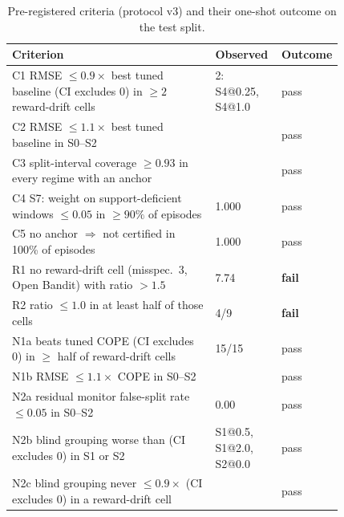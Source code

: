 \begin{table}[t]\centering\scriptsize
\caption{Pre-registered criteria (protocol v3) and their one-shot outcome on the test split.}
\label{tab:criteria}
\begin{tabular}{@{}p{0.62\linewidth}p{0.2\linewidth}l@{}}\toprule Criterion & Observed & Outcome \\\midrule
C1 RMSE $\le 0.9\times$ best tuned baseline (CI excludes 0) in $\ge 2$ reward-drift cells & 2: S4@0.25, S4@1.0 & pass \\
C2 RMSE $\le 1.1\times$ best tuned baseline in S0--S2 &  & pass \\
C3 split-interval coverage $\ge 0.93$ in every regime with an anchor &  & pass \\
C4 S7: weight on support-deficient windows $\le 0.05$ in $\ge 90\%$ of episodes & 1.000 & pass \\
C5 no anchor $\Rightarrow$ not certified in 100\% of episodes & 1.000 & pass \\
R1 no reward-drift cell (misspec.\ 3, Open Bandit) with ratio $> 1.5$ & 7.74 & \textbf{fail} \\
R2 ratio $\le 1.0$ in at least half of those cells & 4/9 & \textbf{fail} \\
N1a beats tuned COPE (CI excludes 0) in $\ge$ half of reward-drift cells & 15/15 & pass \\
N1b RMSE $\le 1.1\times$ COPE in S0--S2 &  & pass \\
N2a residual monitor false-split rate $\le 0.05$ in S0--S2 & 0.00 & pass \\
N2b blind grouping worse than \odrift{} (CI excludes 0) in S1 or S2 & S1@0.5, S1@2.0, S2@0.0 & pass \\
N2c blind grouping never $\le 0.9\times$ \odrift{} (CI excludes 0) in a reward-drift cell &  & pass \\
\bottomrule\end{tabular}\end{table}
